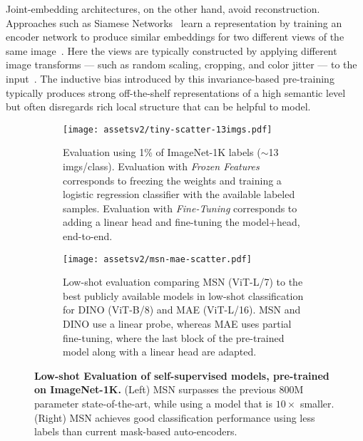 \documentclass{article}
\begin{document}
Joint-embedding architectures, on the other hand, avoid reconstruction. Approaches such as Siamese Networks~\citep{he2019moco,caron2020unsupervised,chen2020exploring,grill2020bootstrap,caron2021emerging,zbontar2021barlow,bardes2021vicreg} learn a representation by training an encoder network to produce similar embeddings for two different views of the same image~\citep{bromley1993signature,exemplarConvNet2014}.
Here the views are typically constructed by applying different image transforms --- such as random scaling, cropping, and color jitter --- to the input~\citep{wu2018unsupervised,misra2020self}.
The inductive bias introduced by this invariance-based pre-training typically produces strong off-the-shelf representations of a high semantic level~\citep{caron2021emerging} but often disregards rich local structure that can be helpful to model.

\begin{figure}[t]
    \centering
    \begin{subfigure}[t]{0.48\linewidth}
        \texttt{[image: assetsv2/tiny-scatter-13imgs.pdf]}
        \caption{Evaluation using 1\% of ImageNet-1K labels ($\sim$13 imgs/class). Evaluation with {\it Frozen Features} corresponds to freezing the weights and training a logistic regression classifier with the available labeled samples. Evaluation with {\it Fine-Tuning} corresponds to adding a linear head and fine-tuning the model+head, end-to-end.}
        \label{fig:1percent}
    \end{subfigure}\hfill
    \begin{subfigure}[t]{0.48\linewidth}
        \texttt{[image: assetsv2/msn-mae-scatter.pdf]}
        \caption{Low-shot evaluation comparing MSN (ViT-L/7) to the best publicly available models in low-shot classification for DINO (ViT-B/8) and MAE (ViT-L/16). MSN and DINO use a linear probe, whereas MAE uses partial fine-tuning, where the last block of the pre-trained model along with a linear head are adapted.}
        \label{fig:lowshot_sweep}
    \end{subfigure}
    \caption{{\bf Low-shot Evaluation of self-supervised models, pre-trained on ImageNet-1K.} (Left) MSN surpasses the previous 800M parameter state-of-the-art, while using a model that is $10\times$ smaller. (Right) MSN achieves good classification performance using less labels than current mask-based auto-encoders.}
    \label{fig:lowshot}
\end{figure}
\end{document}
